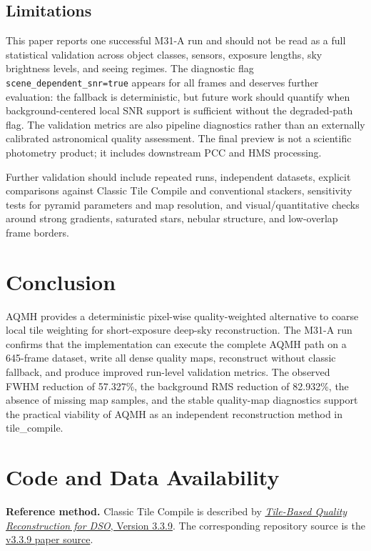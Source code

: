 \documentclass[10pt,twocolumn]{article}
\begin{document}
\subsection{Limitations}

This paper reports one successful M31-A run and should not be read as a full statistical
validation across object classes, sensors, exposure lengths, sky brightness levels, and seeing
regimes. The diagnostic flag \texttt{scene\_dependent\_snr=true} appears for all frames and
deserves further evaluation: the fallback is deterministic, but future work should quantify when
background-centered local SNR support is sufficient without the degraded-path flag. The validation
metrics are also pipeline diagnostics rather than an externally calibrated astronomical quality
assessment. The final preview is not a scientific photometry product; it includes downstream PCC
and HMS processing.

Further validation should include repeated runs, independent datasets, explicit comparisons
against Classic Tile Compile and conventional stackers, sensitivity tests for pyramid parameters
and map resolution, and visual/quantitative checks around strong gradients, saturated stars,
nebular structure, and low-overlap frame borders.

\section{Conclusion}

AQMH provides a deterministic pixel-wise quality-weighted alternative to coarse local tile
weighting for short-exposure deep-sky reconstruction. The M31-A run confirms that the
implementation can execute the complete AQMH path on a 645-frame dataset, write all dense quality
maps, reconstruct without classic fallback, and produce improved run-level validation metrics. The
observed FWHM reduction of \num{57.327}\%, the background RMS reduction of \num{82.932}\%, the
absence of missing map samples, and the stable quality-map diagnostics support the practical
viability of AQMH as an independent reconstruction method in tile\_compile.

\newpage
\section*{Code and Data Availability}

\textbf{Reference method.}
Classic Tile Compile is described by
\href{https://doi.org/10.5281/zenodo.19437794}{\emph{Tile-Based Quality Reconstruction for DSO},
Version 3.3.9}. The corresponding repository source is the
\href{https://github.com/jeamy/tile_compile/blob/master/docs/v3/zenodo-3.3.9/paper-tile_based_quality_reconstruction_methodology_v_3.3.9_en.tex}{v3.3.9
paper source}.
\end{document}
